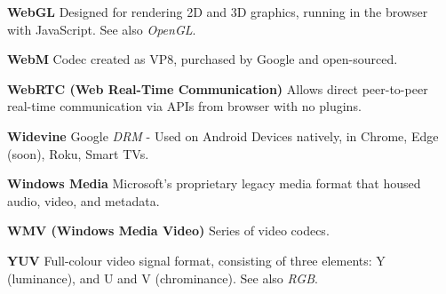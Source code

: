 \smallskip
\textbf{WebGL}
Designed for rendering 2D and 3D graphics, running in the browser with JavaScript. See also \textit{OpenGL}.

\smallskip
\textbf{WebM}
Codec created as VP8, purchased by Google and open-sourced.

\smallskip
\textbf{WebRTC (Web Real-Time Communication)}
Allows direct peer-to-peer real-time communication via APIs from browser with no plugins.

\smallskip
\textbf{Widevine}
Google \textit{DRM} - Used on Android Devices natively, in Chrome, Edge (soon), Roku, Smart TVs.

\smallskip
\textbf{Windows Media}
Microsoft's proprietary legacy media format that housed audio, video, and metadata.

\smallskip
\textbf{WMV (Windows Media Video)}
Series of video codecs.

\smallskip
\textbf{YUV}
Full-colour video signal format, consisting of three elements: Y (luminance), and U and V (chrominance). See also \textit{RGB}.
